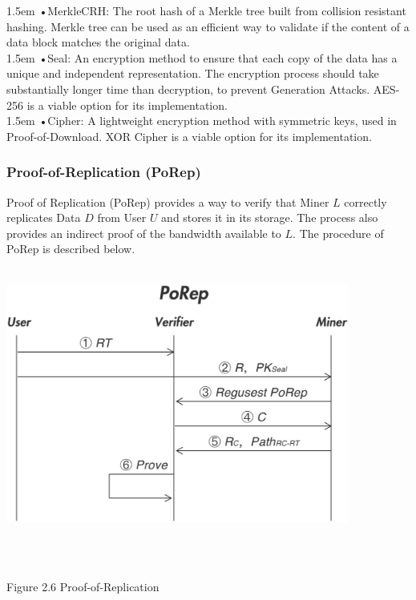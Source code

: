 \documentclass[10pt,a4paper]{article}
\begin{document}
\hangindent 1.5em
\noindent   
•\quad MerkleCRH: The root hash of a Merkle tree built from collision resistant hashing. Merkle tree can be used as an efficient way to validate if the content of a data block matches the original data.
\vspace{-0.8em}
\\

\hangindent 1.5em
\noindent   
•\quad Seal: An encryption method to ensure that each copy of the data has a unique and independent representation. The encryption process should take substantially longer time than decryption, to prevent Generation Attacks. AES-256 is a viable option for its implementation.
\vspace{-0.8em}
\\

\hangindent 1.5em
\noindent   
•\quad Cipher: A lightweight encryption method with symmetric keys, used in Proof-of-Download. XOR Cipher is a viable option for its implementation.  
\vspace{-0.5em}

               \subsubsection{Proof-of-Replication (PoRep)}  %
               
Proof of Replication (PoRep) provides a way to verify that Miner $L$ correctly replicates Data $D$ from User $U$ and stores it in its storage. The process also provides an indirect proof of the bandwidth available to $L$. The procedure of PoRep is described below.
\vspace{-0.8em}
\\ \\ 
\centerline{\includegraphics[width=320pt]{fig6}}
\\ \\\centerline{{Figure 2.6 Proof-of-Replication}}
\vspace{-1.5em}
\\
\end{document}
